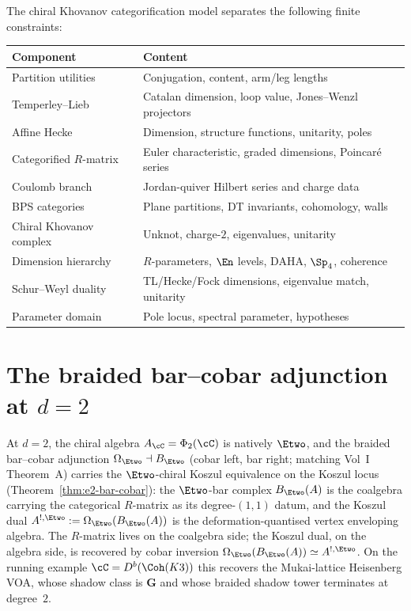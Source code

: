 \begin{remark}
\label{rem:chiral-khovanov-local-constraints}
The chiral Khovanov categorification model separates the following
finite constraints:
\begin{center}
\small
\renewcommand{\arraystretch}{1.15}
\begin{tabular}{ll}
\toprule
\textbf{Component} & \textbf{Content} \\
\midrule
Partition utilities & Conjugation, content, arm/leg lengths \\
Temperley--Lieb & Catalan dimension, loop value, Jones--Wenzl projectors \\
Affine Hecke & Dimension, structure functions, unitarity, poles \\
Categorified $R$-matrix & Euler characteristic, graded dimensions, Poincar\'e series \\
Coulomb branch & Jordan-quiver Hilbert series and charge data \\
BPS categories & Plane partitions, DT invariants, cohomology, walls \\
Chiral Khovanov complex & Unknot, charge-$2$, eigenvalues, unitarity \\
Dimension hierarchy & $R$-parameters, $\En$ levels, DAHA, $\Sp_4$, coherence \\
Schur--Weyl duality & TL/Hecke/Fock dimensions, eigenvalue match, unitarity \\
Parameter domain & Pole locus, spectral parameter, hypotheses \\
\bottomrule
\end{tabular}
\end{center}
\end{remark}

\section{The braided bar--cobar adjunction at \texorpdfstring{$d = 2$}{d = 2}}
\label{sec:braided-factorization-closing}

At $d = 2$, the chiral algebra $A_\cC = \Phi_2(\cC)$ is natively $\Etwo$,
and the braided bar--cobar adjunction $\Omega_{\Etwo} \dashv B_{\Etwo}$ (cobar left, bar right; matching Vol~I Theorem~A)
carries the $\Etwo$-chiral Koszul equivalence on the Koszul locus
(Theorem~\ref{thm:e2-bar-cobar}): the $\Etwo$-bar complex
$B_{\Etwo}(A)$ is the coalgebra carrying the categorical $R$-matrix
as its degree-$(1,1)$ datum, and the Koszul dual
$A^{!,\Etwo} := \Omega_{\Etwo}(B_{\Etwo}(A))$ is the
deformation-quantised vertex enveloping algebra. The $R$-matrix
lives on the coalgebra side; the Koszul dual, on the algebra side,
is recovered by cobar inversion $\Omega_{\Etwo}(B_{\Etwo}(A)) \simeq A^{!,\Etwo}$. On the running
example $\cC = D^b(\Coh(K3))$ this recovers the Mukai-lattice Heisenberg
VOA, whose shadow class is $\mathbf{G}$ and whose braided shadow tower
terminates at degree~$2$.

